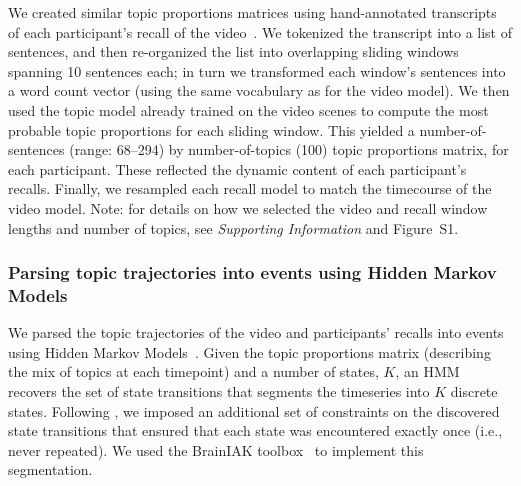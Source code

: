 \documentclass{article}
\newcommand{\topicopt}{S1}
\begin{document}
We created similar topic proportions matrices using hand-annotated transcripts of each participant's recall of the video~\citep[annotated by ][]{ChenEtal17}.  We tokenized the transcript into a list of sentences, and then re-organized the list into overlapping sliding windows spanning 10 sentences each; in turn we transformed each window's sentences into a word count vector (using the same vocabulary as for the video model).  We then used the topic model already trained on the video scenes to compute the most probable topic proportions for each sliding window.  This yielded a number-of-sentences (range: 68--294) by number-of-topics (100) topic proportions matrix, for each participant.  These reflected the dynamic content of each participant's recalls.  Finally, we resampled each recall model to match the timecourse of the video model.  Note: for details on how we selected the video and recall window lengths and number of topics, see \textit{Supporting Information} and Figure~\topicopt.

\subsubsection*{Parsing topic trajectories into events using Hidden Markov Models}
We parsed the topic trajectories of the video and participants' recalls into events using Hidden Markov Models~\citep{Rabi89}.  Given the topic proportions matrix (describing the mix of topics at each timepoint) and a number of states, $K$, an HMM recovers the set of state transitions that segments the timeseries into $K$ discrete states.  Following \cite{BaldEtal17}, we imposed an additional set of constraints on the discovered state transitions that ensured that each state was encountered exactly once (i.e., never repeated).  We used the BrainIAK toolbox~\citep{Brainiak} to implement this segmentation.
\end{document}
